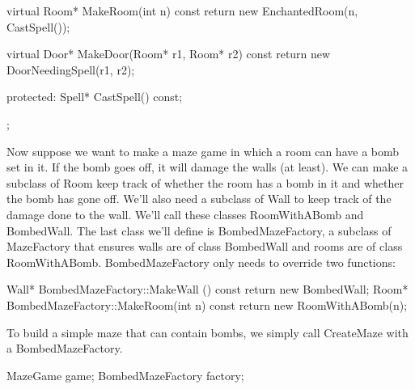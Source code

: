 \documentclass{report}
\begin{document}
\begin{itemize}
\begin{cppcode}
{                        virtual Room* MakeRoom(int n) const
                        { return new EnchantedRoom(n, CastSpell()); }

                        virtual Door* MakeDoor(Room* r1, Room* r2) const
                        { return new DoorNeedingSpell(r1, r2); }

                        protected:
                        Spell* CastSpell() const;
                    };
                \end{cppcode}
                \bigbreak \noindent 
                Now suppose we want to make a maze game in which a room can have a bomb set in it. If the bomb goes off, it will damage the walls (at least). We can make a subclass of Room keep track of whether the room has a bomb in it and whether the bomb has gone off. We'll also need a subclass of Wall to keep track of the damage done to the wall. We'll call these classes RoomWithABomb and BombedWall.
                \bigbreak \noindent 
                The last class we'll define is BombedMazeFactory, a subclass of MazeFactory that ensures walls are of class BombedWall and rooms are of class RoomWithABomb. BombedMazeFactory only needs to override two functions:
                \bigbreak \noindent 
                \begin{cppcode}
                    Wall* BombedMazeFactory::MakeWall () const {
                        return new BombedWall;
                    }
                    Room* BombedMazeFactory::MakeRoom(int n) const {
                        return new RoomWithABomb(n);
                    }
                \end{cppcode}
                \bigbreak \noindent 
                To build a simple maze that can contain bombs, we simply call CreateMaze with a BombedMazeFactory.
                \bigbreak \noindent 
                \begin{cppcode}
                    MazeGame game;
                    BombedMazeFactory factory;


\end{cppcode}
\end{itemize}
\end{document}
